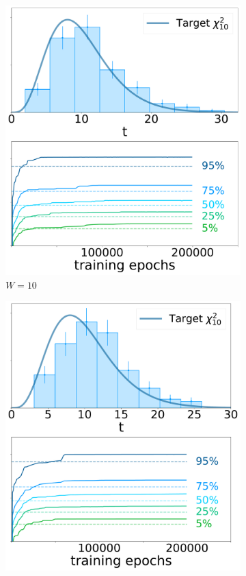 \begin{figure}[h]
\begin{subfigure}[b]{0.25\textwidth}
        \includegraphics[width=1.0\textwidth]{../PLOTS/DRIFT_TIME/thesis/both_7_0.pdf}
        \caption{$W=10$}
        \label{fig:dt_ref:f}
    \end{subfigure}%
    \begin{subfigure}[b]{0.25\textwidth}
        \centering 
        \includegraphics[width=1.0\textwidth]{../PLOTS/DRIFT_TIME/thesis/both_50_0.pdf}

\end{subfigure}
\end{figure}
